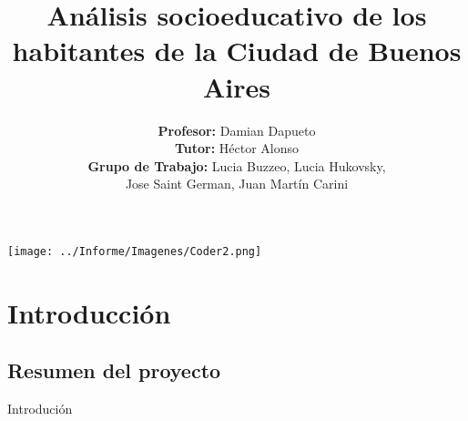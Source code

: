 \documentclass[pdf]{beamer}
\title[Curso Data Science]{\textbf{Análisis socioeducativo de los habitantes de la Ciudad de Buenos Aires}}
\author[Coderhouse]{\textbf{Profesor:} Damian Dapueto \\ \vspace{0.1cm} \textbf{Tutor:} Héctor Alonso \\ \vspace{0.1cm} \textbf{Grupo de Trabajo:} Lucia Buzzeo, Lucia Hukovsky,\\ Jose Saint German, Juan Martín Carini}
\date{}
\begin{document}
\begin{frame}

    \begin{center}
        \texttt{[image: ../Informe/Imagenes/Coder2.png]}
    \end{center}

    \titlepage

\end{frame}

\section{Introducción}

    \subsection{Resumen del proyecto}

\begin{frame}{Introdución}
    
    

\end{frame}




\end{document}
